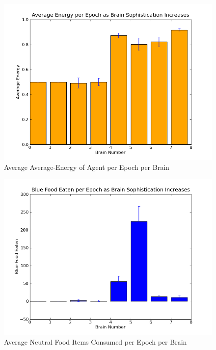 \documentclass[a4paper,11pt]{article}
\begin{document}
\begin{figure}
\begin{center}
  \includegraphics[scale=1.0]{img/avgEnergyBar-0.0-0.0-0.04-0.03-0.02-0.05-0.04-0.01.png}
  \caption{Average Average-Energy of Agent per Epoch per Brain }
  \label{fig:avgenergybar}
\end{center}
\end{figure}

\begin{figure}
\begin{center}
  \includegraphics[scale=1.0]{img/blueBar-0.0-0.0-2.85-1.76-15.72-42.67-3.31-4.54.png}
  \caption{Average Neutral Food Items Consumed per Epoch per Brain }
  \label{fig:bluebar}
\end{center}
\end{figure}
\end{document}
